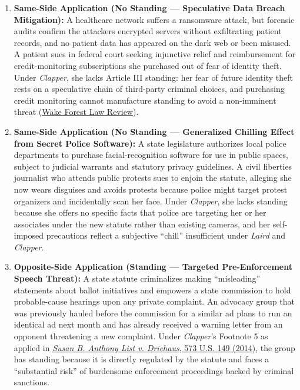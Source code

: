 \documentclass[12pt]{article}
\begin{document}
\begin{enumerate}
    \item \textbf{Same-Side Application (No Standing --- Speculative Data Breach Mitigation):} A healthcare network suffers a ransomware attack, but forensic audits confirm the attackers encrypted servers without exfiltrating patient records, and no patient data has appeared on the dark web or been misused. A patient sues in federal court seeking injunctive relief and reimbursement for credit-monitoring subscriptions she purchased out of fear of identity theft. Under \textit{Clapper}, she lacks Article III standing: her fear of future identity theft rests on a speculative chain of third-party criminal choices, and purchasing credit monitoring cannot manufacture standing to avoid a non-imminent threat (\href{https://www.wakeforestlawreview.com/2026/10/deciphering-charlottes-web-aceituno-v-dhs-and-the-burden-of-proving-an-ongoing-practice/}{Wake Forest Law Review}).

    \item \textbf{Same-Side Application (No Standing --- Generalized Chilling Effect from Secret Police Software):} A state legislature authorizes local police departments to purchase facial-recognition software for use in public spaces, subject to judicial warrants and statutory privacy guidelines. A civil liberties journalist who attends public protests sues to enjoin the statute, alleging she now wears disguises and avoids protests because police might target protest organizers and incidentally scan her face. Under \textit{Clapper}, she lacks standing because she offers no specific facts that police are targeting her or her associates under the new statute rather than existing cameras, and her self-imposed precautions reflect a subjective ``chill'' insufficient under \textit{Laird} and \textit{Clapper}.

    \item \textbf{Opposite-Side Application (Standing --- Targeted Pre-Enforcement Speech Threat):} A state statute criminalizes making ``misleading'' statements about ballot initiatives and empowers a state commission to hold probable-cause hearings upon any private complaint. An advocacy group that was previously hauled before the commission for a similar ad plans to run an identical ad next month and has already received a warning letter from an opponent threatening a new complaint. Under \textit{Clapper}'s Footnote 5 as applied in \href{https://www.scotusblog.com/2014/06/commentary-susan-b-anthony-list-clapper-footnote-5-and-the-state-of-article-iii-standing-doctrine/}{\textit{Susan B. Anthony List v. Driehaus}, 573 U.S. 149 (2014)}, the group has standing because it is directly regulated by the statute and faces a ``substantial risk'' of burdensome enforcement proceedings backed by criminal sanctions.


\end{enumerate}
\end{document}

